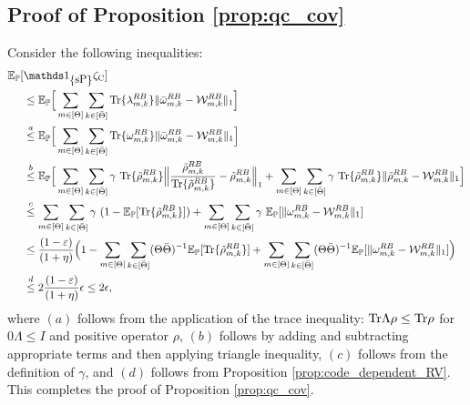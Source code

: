 \subsection{Proof of Proposition \ref{prop:qc_cov}}
\label{app:prop:proof:qc_cov}
Consider the following inequalities:
    \begin{align*}
\EE_\PP[&\I_{\curly{\mbox{\normalfont sP}}}\zeta_{\text{C}}] \\
&\leq\EE_\PP\Big[\sum_{m \in [\Theta]}\sum_{\substack{k\in [\bTheta]}}\Tr\{\lambda_{m,k}^{\refe B}\}\|\omegabar_{m,k}^{\refe B} -  \calW_{m,k}^{\refe B}\|_1\Big]\\
&\overset{a}{\leq}\EE_\PP\Big[\sum_{m \in [\Theta]}\sum_{\substack{k\in [\bTheta]}}\Tr\{\omega_{m,k}^{\refe B}\}\|\omegabar_{m,k}^{\refe B} -  \calW_{m,k}^{\refe B}\|_1\Big]\\
&\overset{b}{\leq}\EE_\PP\Big[\sum_{m \in [\Theta]}\sum_{\substack{k\in [\bTheta]}}\gamma \ \Tr\{\rhotilde_{m,k}^{\refe B}\}\Big\|\frac{\rhotilde_{m,k}^{\refe B}}{\Tr\{\rhotilde_{m,k}^{\refe B}\}} -  \rhotilde_{m,k}^{\refe B}\Big\|_1 + \sum_{m \in [\Theta]}\sum_{\substack{k\in [\bTheta]}}\gamma \ \Tr\{\rhotilde_{m,k}^{\refe B}\}\|\rhotilde_{m,k}^{\refe B} -  \calW_{m,k}^{\refe B}\|_1\Big]\\
&\overset{c}{\leq}\sum_{m \in [\Theta]}\sum_{\substack{k\in [\bTheta]}}\gamma \ (1-\EE_\PP[\Tr\{\rhotilde_{m,k}^{\refe B}\}]) + \sum_{m \in [\Theta]}\sum_{\substack{k\in [\bTheta]}}\gamma \  \EE_\PP[\|\omega_{m,k}^{\refe B} -  \calW_{m,k}^{\refe B}\|_1]\\
&\overset{}{\leq}\frac{(1-\varepsilon)}{(1+\eta)}\Big(1-\sum_{m \in [\Theta]}\sum_{\substack{k\in [\bTheta]}}(\Theta\bTheta)^{-1}\EE_\PP[\Tr\{\rhotilde_{m,k}^{\refe B}\}] + \sum_{m \in [\Theta]}\sum_{\substack{k\in [\bTheta]}}(\Theta\bTheta)^{-1} \EE_\PP[\|\omega_{m,k}^{\refe B} -  \calW_{m,k}^{\refe B}\|_1]\Big)\\
&\overset{d}{\leq}2\frac{(1-\varepsilon)}{(1+\eta)}\epsilon \leq 2\epsilon,
    \end{align*}
    where $(a)$ follows from the application of the trace inequality: $\text{Tr}{\Lambda \rho} \leq \text{Tr}{\rho}$ for $0\Lambda\leq I$ and positive operator $\rho$, $(b)$ follows by adding and subtracting appropriate terms and then applying triangle inequality, $(c)$ follows from the definition of $\gamma$, and $(d)$ follows from Proposition \ref{prop:code_dependent_RV}. This completes the proof of Proposition \ref{prop:qc_cov}.



